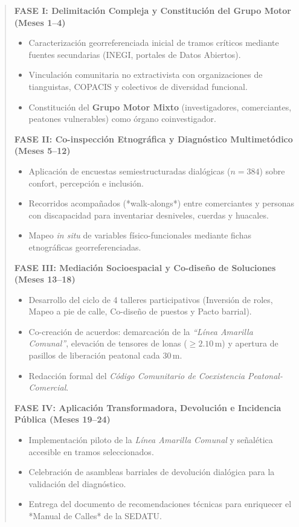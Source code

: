 \documentclass[12pt,a4paper]{article}
\begin{document}
\begin{quote}
\textbf{FASE I: Delimitación Compleja y Constitución del Grupo Motor (Meses 1--4)}
\begin{itemize}
    \item Caracterización georreferenciada inicial de tramos críticos mediante fuentes secundarias (INEGI, portales de Datos Abiertos).
    \item Vinculación comunitaria no extractivista con organizaciones de tianguistas, COPACIS y colectivos de diversidad funcional.
    \item Constitución del \textbf{Grupo Motor Mixto} (investigadores, comerciantes, peatones vulnerables) como órgano coinvestigador.
\end{itemize}

\textbf{FASE II: Co-inspección Etnográfica y Diagnóstico Multimetódico (Meses 5--12)}
\begin{itemize}
    \item Aplicación de encuestas semiestructuradas dialógicas ($n=384$) sobre confort, percepción e inclusión.
    \item Recorridos acompañados (*walk-alongs*) entre comerciantes y personas con discapacidad para inventariar desniveles, cuerdas y huacales.
    \item Mapeo \textit{in situ} de variables físico-funcionales mediante fichas etnográficas georreferenciadas.
\end{itemize}

\textbf{FASE III: Mediación Socioespacial y Co-diseño de Soluciones (Meses 13--18)}
\begin{itemize}
    \item Desarrollo del ciclo de 4 talleres participativos (Inversión de roles, Mapeo a pie de calle, Co-diseño de puestos y Pacto barrial).
    \item Co-creación de acuerdos: demarcación de la \textit{``Línea Amarilla Comunal''}, elevación de tensores de lonas ($\ge 2.10\,\text{m}$) y apertura de pasillos de liberación peatonal cada $30\,\text{m}$.
    \item Redacción formal del \textit{Código Comunitario de Coexistencia Peatonal-Comercial}.
\end{itemize}

\textbf{FASE IV: Aplicación Transformadora, Devolución e Incidencia Pública (Meses 19--24)}
\begin{itemize}
    \item Implementación piloto de la \textit{Línea Amarilla Comunal} y señalética accesible en tramos seleccionados.
    \item Celebración de asambleas barriales de devolución dialógica para la validación del diagnóstico.
    \item Entrega del documento de recomendaciones técnicas para enriquecer el *Manual de Calles* de la SEDATU.
\end{itemize}
\end{quote}
\end{document}
